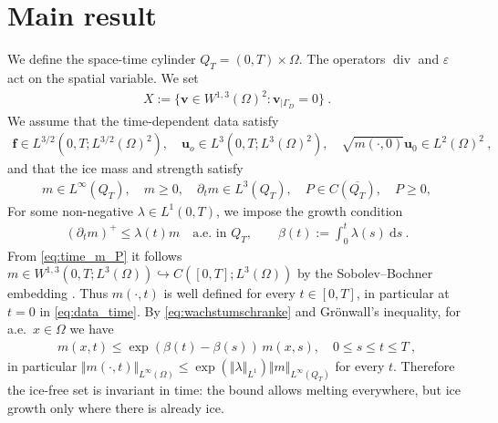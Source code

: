 \documentclass{article}
\theoremstyle{definition}
\newcommand{\bfu}{\boldsymbol{u}}
\newcommand{\bfv}{\boldsymbol{v}}
\newcommand{\bff}{\boldsymbol{f}}
\newcommand{\dd}{\:\mathrm{d}}
\renewcommand\div{\operatorname{\mathrm{div}}}
\begin{document}
\section{Main result}
We define the space-time cylinder $Q_T = (0,T) \times \Omega$.
The operators $\div$ and $\varepsilon$ act on the spatial variable. We set
\begin{align}
    X:= \{\bfv\in W^{1,3}(\Omega)^2:\bfv_{|\Gamma_D}=0\} \ . \label{eq:def_X}
\end{align}
We assume that the time-dependent data satisfy
\begin{align}
    \bff \in L^{3/2}(0,T; L^{3/2}(\Omega)^2), \quad \bfu_o \in L^{3}(0,T; L^3(\Omega)^2), \quad
    \sqrt{m(\cdot,0)}\bfu_0 \in L^2(\Omega)^2   \ , \label{eq:data_time}
\end{align}
and that the ice mass and strength satisfy
\begin{align} \label{eq:time_m_P}
    m \in L^{\infty}(Q_T), \quad m\geq 0, \quad \partial_t m \in L^3(Q_T), \quad P \in C(\overline{Q_T}), \quad P \geq 0,
\end{align}
For some non-negative $\lambda\in L^1(0,T)$, we impose the growth condition
\begin{align}\label{eq:wachstumschranke}
    (\partial_t m)^+\leq\lambda(t)m\quad\text{a.e.\ in }Q_T,\qquad
    \beta(t):=\int_0^t\lambda(s)\dd s\ .
\end{align}
From \eqref{eq:time_m_P} it follows $m\in W^{1,3}(0,T;L^3(\Omega)) \hookrightarrow C([0,T];L^3(\Omega))$
by the Sobolev--Bochner embedding \cite[Section 7.1]{R13}.
Thus $m(\cdot,t)$ is well defined for every $t\in[0,T]$, in particular
at $t=0$ in \eqref{eq:data_time}. By \eqref{eq:wachstumschranke} and
Gr\"onwall's inequality, for a.e.\ $x\in\Omega$ we have
\begin{align}
    m(x,t) \leq \exp(\beta(t)-\beta(s))\, m(x,s), \quad 0\leq s \leq t \leq T \ , \label{eq:Gronwall}
\end{align}
in particular $\Vert m(\cdot,t)\Vert_{L^\infty(\Omega)} \leq \exp(\Vert\lambda\Vert_{L^1})\Vert m\Vert_{L^\infty(Q_T)}$ for every $t$.
Therefore the ice-free set is invariant in time: the bound allows melting everywhere, but
ice growth only where there is already ice.
\end{document}
